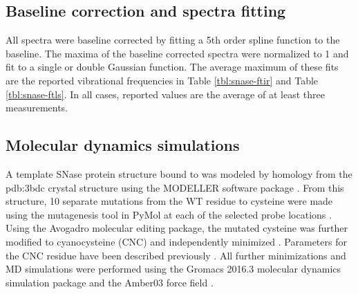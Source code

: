 %
%

\subsection{Baseline correction and spectra fitting}

All spectra were baseline corrected by fitting a 5th order spline function to the baseline. 
The maxima of the baseline corrected spectra were normalized to 1 and fit to a single or double Gaussian function. 
The average maximum of these fits are the reported vibrational frequencies in Table \ref{tbl:snase-ftir} and Table \ref{tbl:snase-ftls}. 
In all cases, reported values are the average of at least three measurements.

\subsection{Molecular dynamics simulations}

A template SNase protein structure bound to  was modeled by homology from the pdb:3bdc crystal structure using the MODELLER software package \cite{Castaneda2009, Marti-Renom2000}. 
From this structure, 10 separate mutations from the WT residue to cysteine were made using the mutagenesis tool in PyMol at each of the selected probe locations \cite{DeLano2002}. 
Using the Avogadro molecular editing package, the mutated cysteine was further modified to cyanocysteine (CNC) and independently minimized \cite{Hanwell2012}. 
Parameters for the CNC residue have been described previously \cite{Stafford2010, Ensign2011}. 
All further minimizations and MD simulations were performed using the Gromacs 2016.3 molecular dynamics simulation package\cite{Abraham2015, Berendsen1995, Hess2008, Lindahl2001, Pall2015, Pronk2013, VanDerSpoel2005} and the Amber03 force field \cite{Duan2003, Sorin2005}.

